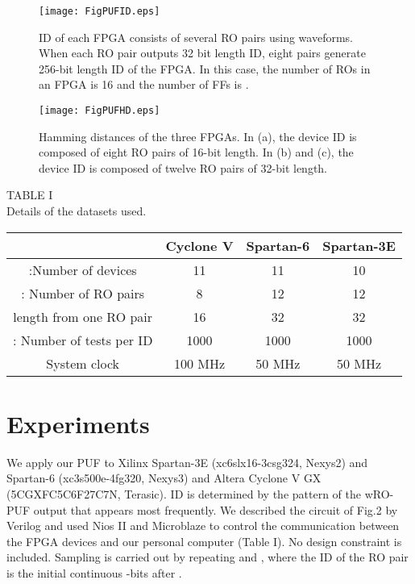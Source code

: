 ﻿\documentclass[aps,preprint,prb,superscriptaddress,amsmath,showpacs,tightenlines]{revtex4}
\begin{document}
\begin{figure}[t]
\begin{center}\texttt{[image: FigPUFID.eps]}
\caption{ 
ID of each FPGA consists of several  RO pairs using waveforms. 
When each RO pair outputs
32 bit length ID, eight pairs  generate 256-bit length ID of the FPGA. In this case, the number 
of ROs in an FPGA is 16 and the number of FFs is .} 
\label{ID}
\end{center}
\end{figure}

\begin{figure}
\centering
\texttt{[image: FigPUFHD.eps]}
\caption{
Hamming distances of the three FPGAs. 
In (a), the device ID  is composed of eight RO pairs of 16-bit length.
In (b) and (c), the device ID is composed of twelve RO pairs of 32-bit length.} 
\label{HD}
\end{figure}


\begin{table}
\begin{center}
TABLE I\\ 
{ Details of the datasets used.} 
\end{center}
\begin{tabular}{|c|c|c|c|}\hline
&  Cyclone V &  Spartan-6 &  Spartan-3E \\ \hline
:Number of devices
& 11 
& 11 
& 10 
\\
: Number of RO pairs
& 8
& 12
& 12
\\
 length from one RO pair
& 16
& 32
& 32
\\
: Number of tests per ID
& 1000
& 1000
& 1000
\\
System clock
& 100 MHz 
& 50 MHz 
& 50 MHz 
\\ \hline
\end{tabular}
\end{table}
\section{Experiments}
We apply our PUF to Xilinx Spartan-3E (xc6slx16-3csg324, Nexys2) and Spartan-6 (xc3s500e-4fg320, Nexys3)
and Altera Cyclone V GX (5CGXFC5C6F27C7N, Terasic).
ID is determined by the pattern of the wRO-PUF output that appears most frequently.
We described the circuit of Fig.2 by Verilog and used Nios II and Microblaze to 
control the communication between the FPGA devices and our personal  computer (Table I).
No design constraint is included.
Sampling is carried out by repeating  and , 
where the ID of the RO pair is the initial continuous -bits after .
\end{document}
